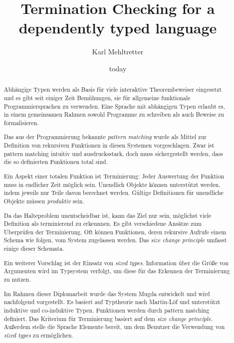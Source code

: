 \documentclass[a4paper,11pt]{report}
\theoremstyle{remark}
\newcommand{\mugda}{\textsf{Mugda }}
\begin{document}



\title{Termination Checking for a dependently typed language}
\author{Karl Mehltretter}
\date{today}
\renewcommand{\abstractname}{Inhalt}
\begin{abstract}
Abh\"angige Typen werden als Basis f\"ur viele interaktive Theorembeweiser eingesetzt und es gibt seit einiger Zeit Bem\"uhungen, sie f\"ur allgemeine funktionale Programmiersprachen zu verwenden.
Eine Sprache mit abh\"angigen Typen erlaubt es, in einem gemeinsamen Rahmen sowohl Programme zu schreiben als auch Beweise zu formalisieren.

Das aus der Programmierung bekannte \emph{pattern matching} wurde als Mittel zur Definition von
rekursiven Funktionen in diesen Systemen vorgeschlagen.
Zwar ist pattern matching intuitiv und ausdrucksstark, doch muss sicher\-gestellt werden, dass die so definierten Funktionen total sind.

Ein Aspekt einer totalen Funktion ist Terminierung: Jeder Auswertung der Funktion muss in endlicher Zeit m\"oglich sein.  Unendlich Objekte k\"onnen unterst\"utzt werden, indem jeweils nur Teile davon berechnet werden.
G\"ultige Definitionen f\"ur unendliche Objekte m\"ussen \emph{produktiv} sein.

Da das Halteproblem unentscheidbar ist, kann das Ziel nur sein, m\"o\-glichst viele Definition als terminierend zu erkennnen. Es gibt verschiedene Ans\"atze zum Uberpr\"ufen der Terminierung.
Oft k\"onnen Funktionen, deren rekursive Aufrufe einem Schema wie folgen,
 vom System zugelassen werden. Das \emph{size change principle} umfasst einige dieser Schemata. 

Ein weiterer Vorschlag ist der Einsatz von \emph{sized types}. Information \"uber die Gr\"o\ss e von Argumenten wird im Typsystem verfolgt, um diese f\"ur das Erkennen der Terminierung zu nutzen.   

Im Rahmen dieser Diplomarbeit wurde das System \mugda entwickelt und wird nachfolgend vorgestellt.
Es basiert auf Typtheorie nach Martin-L\"of und unterst\"utzt induktive und co-induktive Typen. Funktionen werden  durch pattern matching definiert.
Das Kriterium f\"ur Terminierung basiert auf dem \emph{size change principle}.
Au\ss erdem stelle die Sprache Elemente bereit, um dem Benutzer die Verwendung von \emph{sized types} zu erm\"oglichen.
\end{abstract}
\newpage
\end{document}
